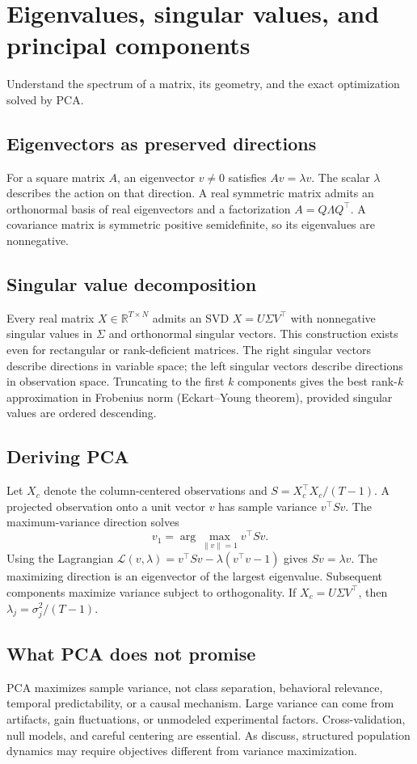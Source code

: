 \chapter{Eigenvalues, singular values, and principal components}\label{ch:pca}
\begin{readergoal}Understand the spectrum of a matrix, its geometry, and the exact optimization solved by PCA.\end{readergoal}
\section{Eigenvectors as preserved directions}
For a square matrix $A$, an eigenvector $v\ne0$ satisfies $Av=\lambda v$. The scalar $\lambda$ describes the action on that direction. A real symmetric matrix admits an orthonormal basis of real eigenvectors and a factorization $A=Q\Lambda Q^\top$. A covariance matrix is symmetric positive semidefinite, so its eigenvalues are nonnegative.

\section{Singular value decomposition}
Every real matrix $X\in\mathbb R^{T\times N}$ admits an SVD $X=U\Sigma V^\top$ with nonnegative singular values in $\Sigma$ and orthonormal singular vectors. This construction exists even for rectangular or rank-deficient matrices. The right singular vectors describe directions in variable space; the left singular vectors describe directions in observation space. Truncating to the first $k$ components gives the best rank-$k$ approximation in Frobenius norm (Eckart--Young theorem), provided singular values are ordered descending.

\section{Deriving PCA}
Let $X_c$ denote the column-centered observations and $S=X_c^\top X_c/(T-1)$. A projected observation onto a unit vector $v$ has sample variance $v^\top Sv$. The maximum-variance direction solves
\[v_1=\arg\max_{\|v\|=1}v^\top Sv.\]
Using the Lagrangian $\mathcal L(v,\lambda)=v^\top Sv-\lambda(v^\top v-1)$ gives $Sv=\lambda v$. The maximizing direction is an eigenvector of the largest eigenvalue. Subsequent components maximize variance subject to orthogonality. If $X_c=U\Sigma V^\top$, then $\lambda_j=\sigma_j^2/(T-1)$.

\section{What PCA does not promise}
PCA maximizes sample variance, not class separation, behavioral relevance, temporal predictability, or a causal mechanism. Large variance can come from artifacts, gain fluctuations, or unmodeled experimental factors. Cross-validation, null models, and careful centering are essential. As \cite{CunninghamYu2014,Churchland2012} discuss, structured population dynamics may require objectives different from variance maximization.

